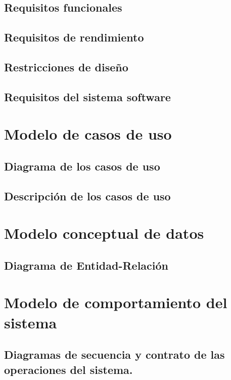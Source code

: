 \subsection{Requisitos funcionales}

\subsection{Requisitos de rendimiento}

\subsection{Restricciones de diseño}

\subsection{Requisitos del sistema software}

\section{Modelo de casos de uso}

\subsection{Diagrama de los casos de uso}
\subsection{Descripción de los casos de uso}

\section{Modelo conceptual de datos}

\subsection{Diagrama de Entidad-Relación}

\section{Modelo de comportamiento del sistema}


\subsection{Diagramas de secuencia y contrato de las operaciones del sistema.}
